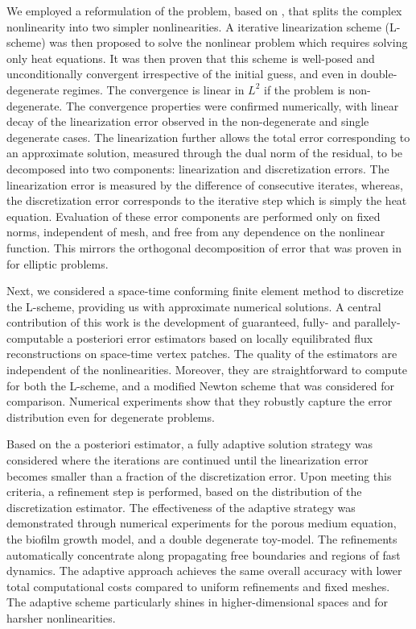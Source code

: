 \documentclass[review,11pt]{article}
\numberwithin{equation}{section}
\begin{document}
We employed a reformulation of the problem, based on \cite{javed2025robust}, that splits the complex nonlinearity into two simpler nonlinearities. A iterative linearization scheme (L-scheme) was then proposed to solve the nonlinear problem which requires solving only heat equations. It was then proven that this scheme is well-posed and unconditionally convergent irrespective of the initial guess, and even in double-degenerate regimes. The convergence is linear in $L^2$ if the problem is non-degenerate. The convergence properties were confirmed numerically, with linear decay of the linearization error 
observed in the non-degenerate and single degenerate cases. The linearization further allows the total error corresponding to an approximate solution, measured through the dual norm of the residual, to be decomposed into two components: linearization  and discretization errors.  The linearization error is measured by the difference of consecutive iterates, whereas, the discretization error corresponds to the iterative step which is simply the heat equation. 
Evaluation of these error components are performed only on fixed norms, independent of mesh, and free from any dependence on the nonlinear function. This mirrors the orthogonal decomposition of error  that was proven in \cite{mitra2023guaranteed} for elliptic problems.

Next, we considered a space-time conforming finite element method to  discretize the L-scheme, providing us with approximate numerical solutions.
A central contribution of this work is the development of guaranteed, fully- and parallely-computable a posteriori error estimators based on locally equilibrated flux reconstructions on space-time vertex patches. The quality of the estimators are independent of the nonlinearities. Moreover, they are straightforward to compute for both the L-scheme, and a modified Newton scheme that was considered for comparison. Numerical experiments show that they robustly capture the error distribution even for degenerate problems. 

Based on the a posteriori estimator, a fully adaptive solution strategy was considered where the iterations are continued until the linearization error becomes smaller than a fraction of the discretization error. Upon meeting this criteria, a refinement step is performed, based on the distribution of the discretization estimator. The effectiveness of the adaptive strategy was demonstrated through numerical experiments for the porous medium equation, the biofilm growth model, and a double degenerate toy-model. The refinements automatically concentrate along propagating free boundaries and regions of fast dynamics. The adaptive approach achieves the same overall accuracy with lower total computational costs compared to uniform refinements and fixed meshes. The adaptive scheme particularly shines in higher-dimensional spaces and for harsher nonlinearities.
\end{document}
